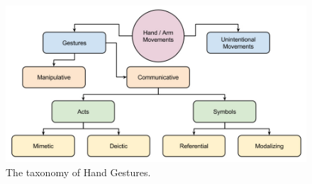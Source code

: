 \begin{figure}
	[h] \centering 
	\includegraphics[width=120mm]{figures/content/ges-tax.jpg} \caption{The taxonomy of Hand Gestures. \cite{2}} \label{fg:ges:tax} 
\end{figure}
